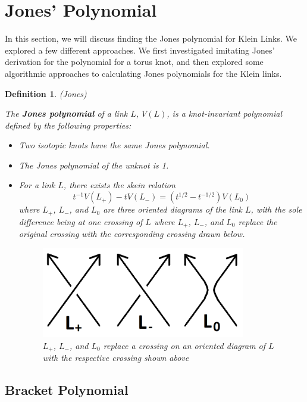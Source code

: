 \documentclass[12pt]{article}
\newtheorem{definition}{Definition}[section]
\begin{document}
\section{Jones' Polynomial}

In this section, we will discuss finding the Jones polynomial for Klein Links. We explored a few different approaches. We first investigated imitating Jones' derivation for the polynomial for a torus knot, and then explored some algorithmic approaches to calculating Jones polynomials for the Klein links. 

\begin{definition} {(Jones)}

The \textbf{Jones polynomial} of a link $L$, $V(L)$, is a knot-invariant polynomial defined by the following properties: 

\begin{itemize}
\item Two isotopic knots have the same Jones polynomial.

\item The Jones polynomial of the unknot is 1. 

\item For a link $L$, there exists the skein relation $$t^{-1} V(L_+) - t V(L_-) = (t^{1/2} - t^{-1/2}) V(L_0)$$ where $L_+$, $L_-$, and $L_0$ are three oriented diagrams of the link $L$, with the sole difference being at one crossing of $L$ where $L_+$, $L_-$, and $L_0$ replace the original crossing with the corresponding crossing drawn below. 

\begin{figure}[H]
\centering
\includegraphics[width=3.5in]{threeLs}
\caption{\label{Jones Crossings} $L_+$, $L_-$, and $L_0$ replace a crossing on an oriented diagram of $L$ with the respective crossing shown above}
\end{figure}

\end{itemize}

\end{definition}

\subsection{Bracket Polynomial} 
\end{document}
